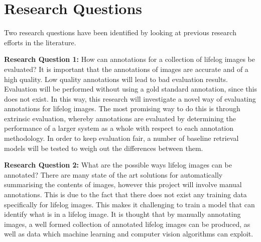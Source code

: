 \section{Research Questions}

Two research questions have been identified by looking at previous research efforts in the literature. 

\textbf{Research Question 1:} How can annotations for a collection of lifelog images be evaluated? It is important that the annotations of images are accurate and of a high quality. Low quality annotations will lead to bad evaluation results. Evaluation will be performed without using a gold standard annotation, since this does not exist. In this way, this research will investigate a novel way of evaluating annotations for lifelog images. The most promising way to do this is through extrinsic evaluation, whereby annotations are evaluated by determining the performance of a larger system as a whole with respect to each annotation methodology. In order to keep evaluation fair, a number of baseline retrieval models will be tested to weigh out the differences between them.

\textbf{Research Question 2:} What are the possible ways lifelog images can be annotated? There are many state of the art solutions for automatically summarising the contents of images, however this project will involve manual annotations. This is due to the fact that there does not exist any training data specifically for lifelog images. This makes it challenging to train a model that can identify what is in a lifelog image. It is thought that by manually annotating images, a well formed collection of annotated lifelog images can be produced, as well as data which machine learning and computer vision algorithms can exploit.
